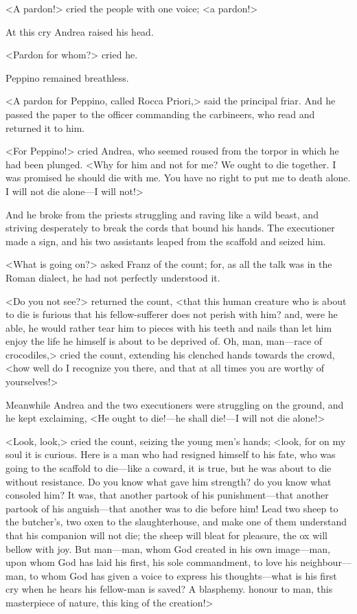  <A pardon!> cried the people with one voice; <a pardon!> 

 At this cry Andrea raised his head. 

 <Pardon for whom?> cried he. 

 Peppino remained breathless. 

 <A pardon for Peppino, called Rocca Priori,> said the principal friar. And he passed the paper to the officer commanding the carbineers, who read and returned it to him. 

 <For Peppino!> cried Andrea, who seemed roused from the torpor in which he had been plunged. <Why for him and not for me? We ought to die together. I was promised he should die with me. You have no right to put me to death alone. I will not die alone—I will not!> 

 And he broke from the priests struggling and raving like a wild beast, and striving desperately to break the cords that bound his hands. The executioner made a sign, and his two assistants leaped from the scaffold and seized him. 

 <What is going on?> asked Franz of the count; for, as all the talk was in the Roman dialect, he had not perfectly understood it. 

 <Do you not see?> returned the count, <that this human creature who is about to die is furious that his fellow-sufferer does not perish with him? and, were he able, he would rather tear him to pieces with his teeth and nails than let him enjoy the life he himself is about to be deprived of. Oh, man, man—race of crocodiles,> cried the count, extending his clenched hands towards the crowd, <how well do I recognize you there, and that at all times you are worthy of yourselves!> 

 Meanwhile Andrea and the two executioners were struggling on the ground, and he kept exclaiming, <He ought to die!—he shall die!—I will not die alone!> 

 <Look, look,> cried the count, seizing the young men's hands; <look, for on my soul it is curious. Here is a man who had resigned himself to his fate, who was going to the scaffold to die—like a coward, it is true, but he was about to die without resistance. Do you know what gave him strength? do you know what consoled him? It was, that another partook of his punishment—that another partook of his anguish—that another was to die before him! Lead two sheep to the butcher's, two oxen to the slaughterhouse, and make one of them understand that his companion will not die; the sheep will bleat for pleasure, the ox will bellow with joy. But man—man, whom God created in his own image—man, upon whom God has laid his first, his sole commandment, to love his neighbour—man, to whom God has given a voice to express his thoughts—what is his first cry when he hears his fellow-man is saved? A blasphemy. honour to man, this masterpiece of nature, this king of the creation!> 

